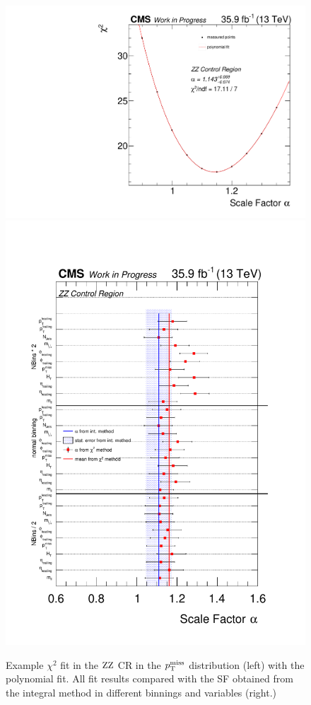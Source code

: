 \begin{figure}[tbp]
 \centering
 \includegraphics[width=\pairwidth]{figures/plots_CR/chi/ZZ_met}
 \includegraphics[width=\pairwidth]{figures/plots_CR/chi/ZZ_Compare}
 \caption{Example $\chi^2$ fit in the $\mathrm{Z}\mathrm{Z}$ CR in the $p_{\mathrm{T}}^\text{miss}$ distribution (left) with the polynomial fit. All fit results compared with the SF obtained from the integral method in different binnings and variables (right.)}
 \label{fig:chiZZ}
\end{figure}

